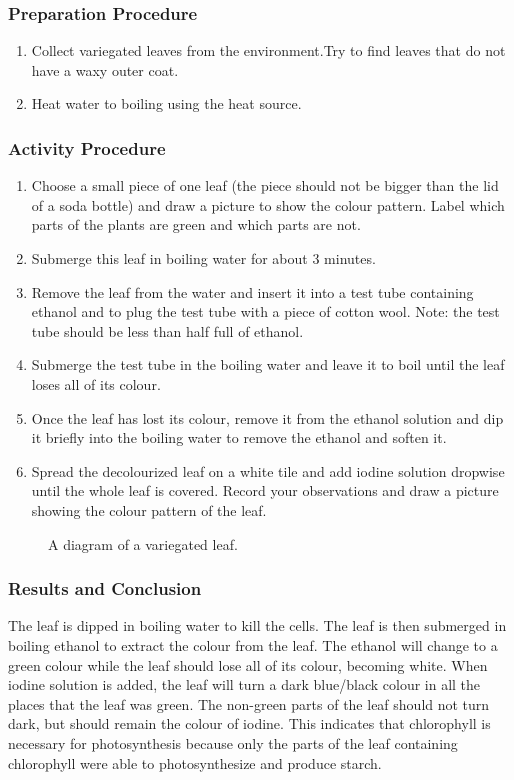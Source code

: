 \subsubsection*{Preparation Procedure}
\begin{enumerate}
\item{Collect variegated leaves from the environment.Try to find leaves that do not have a waxy outer coat.}
\item{Heat water to boiling using the heat source.}
\end{enumerate}

\subsubsection*{Activity Procedure}
\begin{enumerate}
\item{Choose a small piece of one leaf (the piece should not be bigger than the lid of a soda bottle) and draw a picture to show the colour pattern. Label which parts of the plants are green and which parts are not.}
\item{Submerge this leaf in boiling water for about 3 minutes.}
\item{Remove the leaf from the water and insert it into a test tube containing ethanol and to plug the test tube with a piece of cotton wool. Note: the test tube should be less than half full of ethanol.}
\item{Submerge the test tube in the boiling water and leave it to boil until the leaf loses all of its colour.}
\item{Once the leaf has lost its colour, remove it from the ethanol solution and dip it briefly into the boiling water to remove the ethanol and soften it.}
\item{Spread the decolourized leaf on a white tile and add iodine solution dropwise until the whole leaf is covered. Record your observations and draw a picture showing the colour pattern of the leaf.}
\end{enumerate}

\begin{figure}[h]
\begin{center}
\def\svgwidth{6cm}

\caption{A diagram of a variegated leaf.}
\label{fig:variegate leaf}
\end{center}
\end{figure}

\subsubsection*{Results and Conclusion}
The leaf is dipped in boiling water to kill the cells. The leaf is then submerged in boiling ethanol to extract the colour from the leaf. The ethanol will change to a green colour while the leaf should lose all of its colour, becoming white. When iodine solution is added, the leaf will turn a dark blue/black colour in all the places that the leaf was green. The non-green parts of the leaf should not turn dark, but should remain the colour of iodine. This indicates that chlorophyll is necessary for photosynthesis because only the parts of the leaf containing chlorophyll were able to photosynthesize and produce starch.

